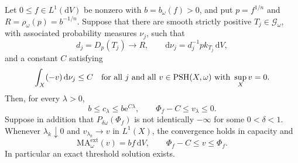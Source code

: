 \begin{theorem}\label{thm:gauduchon-moment-threshold}
Let $0\leq f\in L^1(\mathrm{d}V)$ be nonzero with $b=b_\omega(f)>0$, and put $p=f^{1/n}$ and $R=\rho_\omega(p)=b^{-1/n}$. Suppose that there are smooth strictly positive $T_j\in\mathscr G_\omega$, with associated probability measures $\nu_j$, such that
\[
 d_j=D_p(T_j)\longrightarrow R,\qquad
 \mathrm{d}\nu_j=d_j^{-1}p k_{T_j}\,\mathrm{d}V,
\]
and a constant $C$ satisfying
\begin{equation}\label{eq:maximizing-gauduchon-moments}
 \int_X(-v)\,\mathrm{d}\nu_j\leq C
 \quad\text{for all }j\text{ and all }v\in\mathrm{PSH}(X,\omega)
                  \text{ with }\sup_Xv=0.
\end{equation}
Then, for every $\lambda>0$,
\[
 b\leq c_\lambda\leq b\mathrm{e}^{C\lambda},\qquad
 \Phi_f-C\leq v_\lambda\leq0.
\]
Suppose in addition that $P_{\delta\omega}(\Phi_f)$ is not identically $-\infty$ for some $0<\delta<1$. Whenever $\lambda_k\downarrow0$ and $v_{\lambda_k}\to v$ in $L^1(X)$, the convergence holds in capacity and
\[
 \mathrm{MA}^{\mathrm{ext}}_\omega(v)=bf\,\mathrm{d}V,
 \qquad \Phi_f-C\leq v\leq\Phi_f.
\]
In particular an exact threshold solution exists.
\end{theorem}
